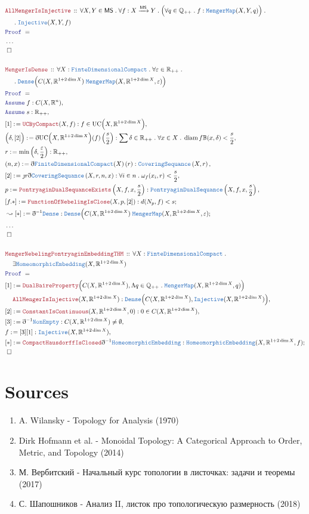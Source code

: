 \documentclass[12pt]{scrartcl}
\newcommand{\TYPE}[1]{\textcolor{NavyBlue}{\mathtt{#1}}}
\newcommand{\LOGIC}[1]{\textcolor{Blue}{\mathtt{#1}}}
\newcommand{\THM}[1]{\textcolor{Maroon}{\mathtt{#1}}}
\renewcommand{\.}{\; . \;}
\newcommand{\de}{: \kern 0.1pc =}
\newcommand{\Act}[1]{\left( #1 \right)}
\newcommand{\Theorem}[2]{& \THM{#1} \, :: \, #2 \\ & \Proof = \\ }
\newcommand{\NewLine}{\\ & \kern 1pc}
\newcommand{\Page}[1]{ \begin{align*} #1 \end{align*}   }
\newcommand{ \bd }{ \ByDef }
\newcommand{\NoProof}{ & \ldots \\ \EndProof}
\newcommand{\Reals}{\mathbb{R} }
\newcommand{\Rats}{\mathbb{Q} }
\newcommand{\Arrow}{\xrightarrow}
\newcommand{\Say}[3]{& #1 \de #2 : #3, \\}
\newcommand{\Conclude}[3]{& #1 \de #2 : #3; \\}
\newcommand{\DeriveConclude}[3]{& \leadsto #1 \de #2 : #3 ; \\}
\newcommand{\Assume}[2]{& \LOGIC{Assume} \; #1 : #2, \\}
\newcommand{\QED}{\; \square}
\newcommand{\EndProof}{& \QED \\}
\newcommand{\ByDef}{\eth}
\newcommand{\ByConstr}{\jmath}
\newcommand{\Proof}{\LOGIC{Proof} \; }
\DeclareMathOperator{\diam}{diam}
\newcommand{\MS}{\mathsf{MS}}
\begin{document}
\Page{
	\Theorem{AllMengerIsInjective}{\forall X,Y \in \MS \. \forall f : X \Arrow{\MS} Y \. \Big( \forall q \in \Rats_{++} \. f : \TYPE{MengerMap}(X,Y,q)\Big) \.  \NewLine \. \TYPE{Injective}(X,Y,f) }
	\NoProof
	\\
	\Theorem{MengerIsDense}{\forall X :  \TYPE{FinteDimensionalCompact} \.    \forall \varepsilon \in \Reals_{++} \. \NewLine \. \TYPE{Dense}\Big( C(X,\Reals^{1 + 2\dim X}) \; \TYPE{MengerMap}(X,\Reals^{1 + 2\dim X},\varepsilon)   \Big)}
	\Assume{f}{C(X,\Reals^n)}
	\Assume{s}{\Reals_{++}}
	\Say{[1]}{\THM{UCByCompact}(X,f)}{f \in \mathrm{UC}\Big(X, \Reals^{1 + 2\dim X}\Big)}
	\Say{\Big( \delta, [2] \Big)}{\bd  \mathrm{UC}\Big(X, \Reals^{1 + 2\dim X}\Big)(f)\Act{\frac{s}{2}}}
	{
		\sum \delta \in \Reals_{++} \. \forall x \in X \. \diam f\mathbb{B}(x,\delta) < \frac{s}{2}
	}
	\Say{r}{\min\Act{\delta, \frac{\varepsilon}{2}}}{\Reals_{++}}
	\Say{(n,x)}{\bd \TYPE{FiniteDimensionalCompact}(X)\Act{r}}{\TYPE{CoveringSequance}\Act{X,r}}
	\Say{[2]}{\ByConstr r \bd \TYPE{CoveringSequance}\Act{X,r,n,x} }{\forall i \in n \.  \omega_f(x_i, r) < \frac{s}{2} }
	\Say{p}{\THM{PontryaginDualSequanceExists}\Act{X,f,x,\frac{s}{2}}}{\TYPE{PontryaginDualSequance}\Act{X,f,x,\frac{s}{2}}}
	\Conclude{[f.*]}{\THM{FunctionOfNebelingIsClose}(X,p,[2])}{ d(N_p,f) < s }
	\DeriveConclude{[*]}{\bd^{-1} \TYPE{Dense}}{   \TYPE{Dense}\Big( C(X,\Reals^{1 + 2\dim X}) \; \TYPE{MengerMap}(X,\Reals^{1 + 2\dim X},\varepsilon)   }
	\NoProof
	\\
	\Theorem{MengerNebelingPontryaginEmbeddingTHM}{\forall X :  \TYPE{FinteDimensionalCompact} \. \NewLine  \exists \TYPE{HomeomorphicEmbedding}(X,\Reals^{1 + 2\dim X} ) }
	\Say{[1]}{\THM{DualBaireProperty}\Big(  C(X,\Reals^{1 + 2\dim X}), \Lambda q \in \Rats_{++} \. \TYPE{MengerMap}(X,\Reals^{1 + 2\dim X},q)  \Big) \NewLine \THM{AllMengerIsInjective}(X,\Reals^{1 + 2\dim X})}
	{
		\TYPE{Dense}\Big(  C(X,\Reals^{1 + 2\dim X})  ,\TYPE{Injective}(X,\Reals^{1 + 2\dim X}) \Big)
	}
	\Say{[2]}{\THM{ConstantIsContinuous}(X,\Reals^{1 + 2\dim X},0)}{0 \in  C(X,\Reals^{1 + 2\dim X}) }
	\Say{[3]}{\bd^{-1} \TYPE{NonEmpty}}{C(X,\Reals^{1 + 2\dim X}) \neq \emptyset}
	\Say{f}{[3][1]}{\TYPE{Injective}(X,\Reals^{1 + 2\dim X})}
	\Conclude{[*]}{\THM{CompactHausdorffIsClosed}\bd^{-1} \TYPE{HomeomorphicEmbedding}}{\TYPE{HomeomorphicEmbedding}(X,\Reals^{1 + 2\dim X},f )}
	\EndProof 
}
\newpage
\section*{Sources}
\begin{enumerate}
\item A. Wilansky - Topology for Analysis (1970) 
\item Dirk Hofmann et al. - Monoidal Topology: A Categorical Approach to Order, Metric, and Topology (2014)
\item М. Вербитский - Начальный курс топологии в листочках: задачи и теоремы (2017)
\item С. Шапошников - Анализ II, листок про топологическую размерность (2018)
\end{enumerate}
\end{document}
